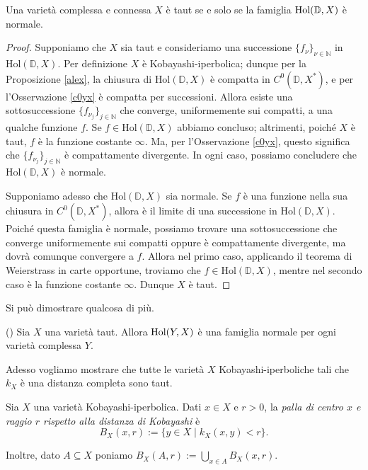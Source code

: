 \begin{prop}
    Una varietà complessa e connessa $X$ è taut se e solo se la famiglia $\textnormal{Hol}(\mathbb{D},X)$ è normale.
\end{prop}
\begin{proof}
    Supponiamo che $X$ sia taut e consideriamo una successione $\{f_{\nu}\}_{\nu\in\mathbb{N}}$ in $\text{Hol}(\mathbb{D},X)$. Per definizione $X$ è Kobayashi-iperbolica; dunque per la Proposizione \ref{alex}, la chiusura di $\text{Hol}(\mathbb{D},X)$ è compatta in $C^0(\mathbb{D},X^*)$, e per l'Osservazione \ref{c0yx} è compatta per successioni. Allora esiste una sottosuccessione $\{f_{\nu_j}\}_{j \in \mathbb{N}}$ che converge, uniformemente sui compatti, a una qualche funzione $f$. Se $f \in \text{Hol}(\mathbb{D},X)$ abbiamo concluso; altrimenti, poiché $X$ è taut, $f$ è la funzione costante $\infty$. Ma, per l'Osservazione \ref{c0yx}, questo significa che $\{f_{\nu_j}\}_{j \in \mathbb{N}}$ è compattamente divergente. In ogni caso, possiamo concludere che $\text{Hol}(\mathbb{D},X)$ è normale.

    Supponiamo adesso che $\text{Hol}(\mathbb{D},X)$ sia normale. Se $f$ è una funzione nella sua chiusura in $C^0(\mathbb{D},X^*)$, allora è il limite di una successione in $\text{Hol}(\mathbb{D},X)$. Poiché questa famiglia è normale, possiamo trovare una sottosuccessione che converge uniformemente sui compatti oppure è compattamente divergente, ma dovrà comunque convergere a $f$. Allora nel primo caso, applicando il teorema di Weierstrass in carte opportune, troviamo che $f \in \text{Hol}(\mathbb{D},X)$, mentre nel secondo caso è la funzione costante $\infty$. Dunque $X$ è taut.
\end{proof}

Si può dimostrare qualcosa di più.

\begin{prop}
    (\cite[Theorem 2.1.2]{A1}) Sia $X$ una varietà taut. Allora $\textnormal{Hol}(Y,X)$ è una famiglia normale per ogni varietà complessa $Y$.
\end{prop}

Adesso vogliamo mostrare che tutte le varietà $X$ Kobayashi-iperboliche  tali che $k_X$ è una distanza completa sono taut.

\begin{defn}
    Sia $X$ una varietà Kobayashi-iperbolica. Dati $x\in X$ e $r>0$, la \textit{palla di centro $x$ e raggio $r$ rispetto alla distanza di Kobayashi} è
    $$B_X(x,r):=\{y\in X\mid k_X(x,y)<r\}.$$

    Inoltre, dato $A\subseteq X$ poniamo $B_X(A,r):=\displaystyle\bigcup_{x\in A} B_X(x,r)$.
\end{defn}

